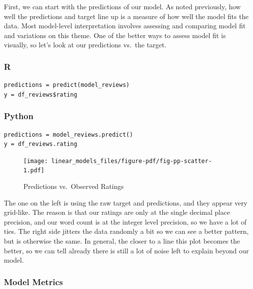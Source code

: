 \documentclass[
  letterpaper,
]{krantz}
\begin{document}
First, we can start with the predictions of our model. As noted
previously, how well the predictions and target line up is a measure of
how well the model fits the data. Most model-level interpretation
involves assessing and comparing model fit and variations on this theme.
One of the better ways to assess model fit is visually, so let's look at
our predictions vs.~the target.

\subsubsection{R}

\begin{verbatim}
predictions = predict(model_reviews)
y = df_reviews$rating
\end{verbatim}

\subsubsection{Python}

\begin{verbatim}
predictions = model_reviews.predict()
y = df_reviews.rating
\end{verbatim}

\begin{figure}

{\centering \texttt{[image: linear\_models\_files/figure-pdf/fig-pp-scatter-1.pdf]}

}

\caption{\label{fig-pp-scatter}Predictions vs.~Observed Ratings}

\end{figure}

The one on the left is using the raw target and predictions, and they
appear very grid-like. The reason is that our ratings are only at the
single decimal place precision, and our word count is at the integer
level precision, so we have a lot of ties. The right side jitters the
data randomly a bit so we can see a better pattern, but is otherwise the
same. In general, the closer to a line this plot becomes the better, so
we can tell already there is still a lot of noise left to explain beyond
our model.

\subsubsection{Model Metrics}\label{sec-lm-interpretation-model-metrics}
\end{document}
